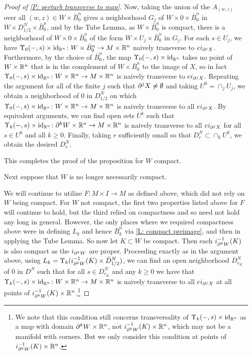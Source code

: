 \begin{proof}[Proof of \cref{P: perturb transverse to map}]
	Now, taking the union of the $A_{(w,z)}$ over all $(w,z) \in W \times \bar B^n_0$ gives a neighborhood $G_j$ of $W \times 0 \times \bar B^n_0$ in $W \times D_{1/2}^N \times \bar B^n_0$, and by the Tube Lemma, as $W \times \bar B^n_0$ is compact, there is a neighborhood of $W \times 0 \times \bar B^n_0$ of the form $W \times U_j \times \bar B^n_0$ in $G_j$.
	For each $s \in U_j$, we have $\Upsilon_0(-,s) \times \mathrm{id}_{\mathbb{R}^n} \colon W \times \bar B^n_0 \to M \times \mathbb{R}^n$ naively transverse to $ei_{\partial^jX}$.
	Furthermore, by the choice of $\bar B^n_0$, the map $\Upsilon_0(-,s) \times \mathrm{id}_{\mathbb{R}^n}$ takes no point of $W \times \mathbb{R}^n$ that is in the complement of $W \times \bar B^n_0$ to the image of $X$,
	so in fact $\Upsilon_0(-,s) \times \mathrm{id}_{\mathbb{R}^n} \colon W \times \mathbb{R}^n \to M \times \mathbb{R}^n$ is naively transverse to $ei_{\partial^jX}$.
	Repeating the argument for all of the finite $j$ such that $\partial^jX \neq \emptyset$ and taking $U^0 = \cap_j U_j$, we obtain a neighborhood of $0$ in $D_{1/2}^N$ on which $\Upsilon_0(-,s) \times \mathrm{id}_{\mathbb{R}^n} \colon W \times \mathbb{R}^n \to M \times \mathbb{R}^n$ is naively transverse to all $ei_{\partial^jX}$.
	By equivalent arguments, we can find open sets $U^k$ such that $\Upsilon_k(-,s) \times \mathrm{id}_{\mathbb{R}^n} \colon \partial^k W \times \mathbb{R}^n \to M \times \mathbb{R}^n$ is naively transverse to all $ei_{\partial^jX}$ for all $s \in U^k$ and all $k\geq 0$.
	Finally, taking $r$ sufficiently small so that $D_r^N \subset \cap_k U^k$, we obtain the desired $D_r^N$.

	This completes the proof of the proposition for $W$ compact.

	Next suppose that $W$ is no longer necessarily compact.

	We will continue to utilize $F \colon M \times I \to M$ as defined above, which did not rely on $W$ being compact.
	For $W$ not compact, the first two properties listed above for $F$ will continue to hold, but the third relied on compactness and so need not hold any long in general.
	However, the only places where we required compactness above were in defining $L_k$ and hence $\bar B^n_k$ via \cref{L: compact preimage}, and then in applying the Tube Lemma.
	So now let $K \subset W$ be compact.
	Then each $i_{\partial^k W}^{-1}(K)$ is also compact as the $i_{\partial^k W}$ are proper.
	Proceeding exactly as in the argument above, using $L_k = \Upsilon_k(i_{\partial^k W}^{-1}(K) \times \bar D^N_{1/2})$, we can find an open neighborhood
	$D_{r_K}^N$ of $0$ in $D^N$ such that for all $s \in D_{r_K}^N$ and any $k\geq 0$ we have that $\Upsilon_k(-,s) \times \mathrm{id}_{\mathbb{R}^n} \colon W \times \mathbb{R}^n \to M \times \mathbb{R}^n$ is naively transverse to all $ei_{\partial^j X}$ at all points of $i_{\partial^k W}^{-1}(K) \times \mathbb{R}^n$.\footnote{We note that this condition still concerns transversality of $\Upsilon_k(-,s) \times \mathrm{id}_{\mathbb{R}^n}$ as a map with domain $\partial^k W \times \mathbb{R}^n$, not $i_{\partial^k W}^{-1}(K) \times \mathbb{R}^n$, which may not be a manifold with corners. But we only consider this condition at points of $i_{\partial^k W}^{-1}(K) \times \mathbb{R}^n$.}


\end{proof}

